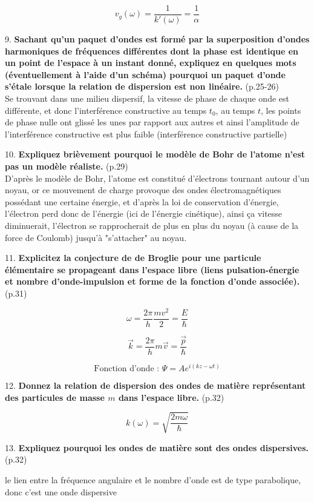 \documentclass	[11pt, a4paper, openany]{book}
\newcommand{\questpm}[3]{#1. \textbf{#3} (p.#2)}
\begin{document}
$$ v_g(\omega) = \dfrac{1}{k'(\omega)} = \dfrac{1}{\alpha} $$

\questpm{9}{25-26}{Sachant qu’un paquet d’ondes est formé par la superposition d’ondes harmoniques de fréquences différentes dont la phase est identique en un point de l’espace à un instant donné, expliquez en quelques mots (éventuellement à l’aide d’un schéma) pourquoi un paquet d’onde s’étale lorsque la relation de dispersion est non linéaire.}
\ \\ Se trouvant dans une milieu dispersif, la vitesse de phase de chaque onde est différente, et donc l'interférence constructive au temps $t_0$, au temps $t$, les points de phase nulle ont glissé les unes par rapport aux autres et ainsi l'amplitude de l'interférence constructive est plus faible (interférence constructive partielle)
\vspace{1cm}

\questpm{10}{29}{Expliquez brièvement pourquoi le modèle de Bohr de l’atome n’est pas un modèle réaliste.}
\ \\ D'après le modèle de Bohr, l'atome est constitué d'électrons tournant autour d'un noyau, or ce mouvement de charge provoque des ondes électromagnétiques possédant une certaine énergie, et d'après la loi de conservation d'énergie, l'électron perd donc de l'énergie (ici de l'énergie cinétique), ainsi ça vitesse diminuerait, l'électron se rapprocherait de plus en plus du noyau (à cause de la force de Coulomb) jusqu'à "s'attacher" au noyau.
\vspace{1cm}


\questpm{11}{31}{Explicitez la conjecture de de Broglie pour une particule élémentaire se propageant dans l’espace libre (liens pulsation-énergie et nombre d’onde-impulsion et forme de la fonction d’onde associée).}

$$ \omega = \dfrac{2\pi}{h}\dfrac{mv^2}{2} = \dfrac{E}{\hbar} $$

$$ \vec k = \dfrac{2\pi}{h}m\vec v = \dfrac{\vec p}{\hbar} $$

$$ \text{Fonction d'onde : } \Psi = Ae^{i(kz-\omega t)} $$

\questpm{12}{32}{Donnez la relation de dispersion des ondes de matière représentant des particules de masse $m$ dans l’espace libre.}

$$ k(\omega) = \sqrt{\dfrac{2m\omega}{\hbar}} $$

\questpm{13}{32}{Expliquez pourquoi les ondes de matière sont des ondes dispersives.}

le lien entre la fréquence angulaire et le
nombre d'onde est de type parabolique, donc c'est une onde dispersive
\end{document}
